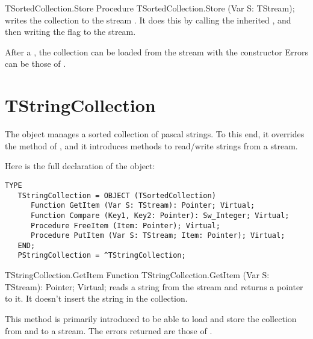 \begin{procedure}{TSortedCollection.Store}
\Declaration
Procedure TSortedCollection.Store (Var S: TStream);
\Description
{} writes the collection to the stream . It does this by
calling the inherited , and then writing the
 flag to the stream.

After a , the collection can be loaded from the stream with the 
constructor 
\Errors
Errors can be those of .
\SeeAlso
{}
\end{procedure}

\section{TStringCollection}
\label{se:TStringCollection}

The  object manages a sorted collection of pascal 
strings. 
To this end, it overrides the 
method of , and it introduces methods to read/write
strings from a stream.

Here is the full declaration of the  object:
\begin{verbatim}
TYPE
   TStringCollection = OBJECT (TSortedCollection)
      Function GetItem (Var S: TStream): Pointer; Virtual;
      Function Compare (Key1, Key2: Pointer): Sw_Integer; Virtual;
      Procedure FreeItem (Item: Pointer); Virtual;
      Procedure PutItem (Var S: TStream; Item: Pointer); Virtual;
   END;
   PStringCollection = ^TStringCollection;
\end{verbatim}


\begin{function}{TStringCollection.GetItem}
\Declaration
Function TStringCollection.GetItem (Var S: TStream): Pointer; Virtual;
\Description
{} reads a string from the stream  and returns a pointer 
to it. It doesn't insert the string in the collection.

This method is primarily introduced to be able to load and store the
collection from and to a stream.
\Errors
The errors returned are those of .
\SeeAlso
{}
\end{function}

